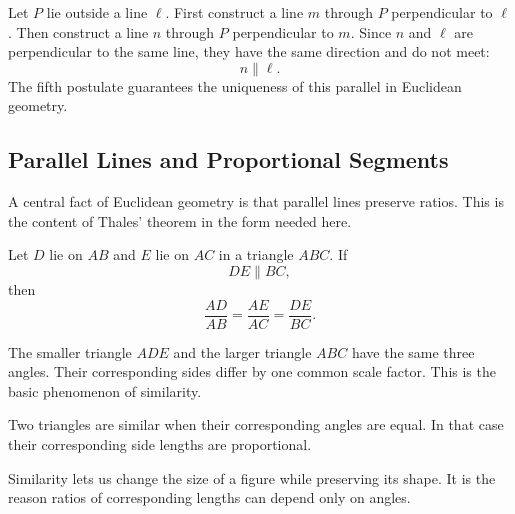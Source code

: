 Let $P$ lie outside a line $\ell$. First construct a line $m$ through $P$
perpendicular to $\ell$. Then construct a line $n$ through $P$ perpendicular
to $m$. Since $n$ and $\ell$ are perpendicular to the same line, they have the
same direction and do not meet:
\[
n\parallel\ell.
\]
The fifth postulate guarantees the uniqueness of this parallel in Euclidean
geometry.

\subsection{Parallel Lines and Proportional Segments}

A central fact of Euclidean geometry is that parallel lines preserve ratios.
This is the content of Thales' theorem in the form needed here.

\begin{theorembox}
Let $D$ lie on $AB$ and $E$ lie on $AC$ in a triangle $ABC$. If
\[
DE\parallel BC,
\]
then
\[
\frac{AD}{AB}
=
\frac{AE}{AC}
=
\frac{DE}{BC}.
\]
\end{theorembox}

\begin{center}
\end{center}

The smaller triangle $ADE$ and the larger triangle $ABC$ have the same three
angles. Their corresponding sides differ by one common scale factor. This is
the basic phenomenon of similarity.

\begin{definitionbox}
Two triangles are similar when their corresponding angles are equal. In that
case their corresponding side lengths are proportional.
\end{definitionbox}

Similarity lets us change the size of a figure while preserving its shape. It
is the reason ratios of corresponding lengths can depend only on angles.


